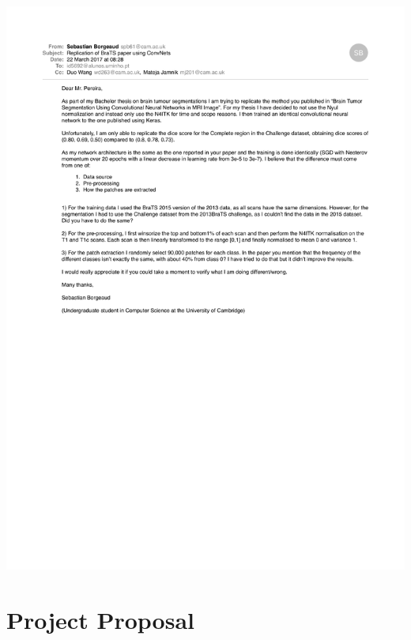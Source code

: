 \documentclass[12pt,a4paper,twoside,openright]{report}
\begin{document}
\includegraphics[width=\textwidth]{email2.pdf}

\chapter{Project Proposal}


\end{document}
